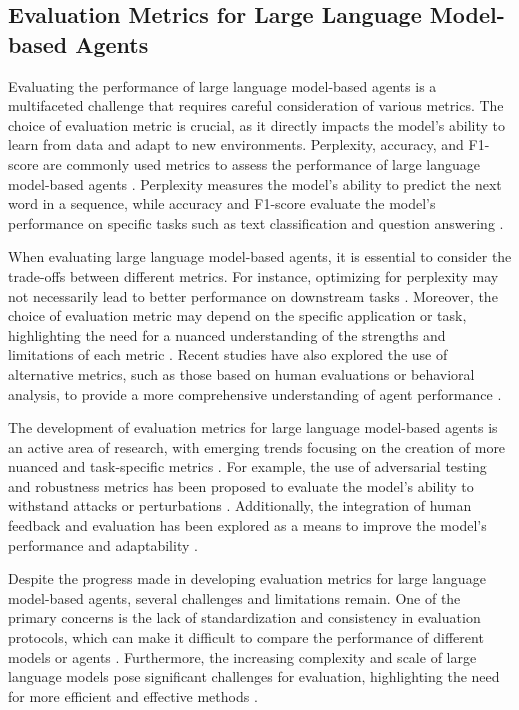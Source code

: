 \documentclass[11pt,a4paper]{article}
\begin{document}
\subsection{Evaluation Metrics for Large Language Model-based Agents}


Evaluating the performance of large language model-based agents is a multifaceted challenge that requires careful consideration of various metrics. The choice of evaluation metric is crucial, as it directly impacts the model's ability to learn from data and adapt to new environments. Perplexity, accuracy, and F1-score are commonly used metrics to assess the performance of large language model-based agents \cite{doi:10.1145/3641289}. Perplexity measures the model's ability to predict the next word in a sequence, while accuracy and F1-score evaluate the model's performance on specific tasks such as text classification and question answering \cite{arxiv:2404.09135}.

When evaluating large language model-based agents, it is essential to consider the trade-offs between different metrics. For instance, optimizing for perplexity may not necessarily lead to better performance on downstream tasks \cite{doi:10.1145/3748302}. Moreover, the choice of evaluation metric may depend on the specific application or task, highlighting the need for a nuanced understanding of the strengths and limitations of each metric \cite{arxiv:2402.12914}. Recent studies have also explored the use of alternative metrics, such as those based on human evaluations or behavioral analysis, to provide a more comprehensive understanding of agent performance \cite{arxiv:2308.03688}.

The development of evaluation metrics for large language model-based agents is an active area of research, with emerging trends focusing on the creation of more nuanced and task-specific metrics \cite{arxiv:2404.09022}. For example, the use of adversarial testing and robustness metrics has been proposed to evaluate the model's ability to withstand attacks or perturbations \cite{arxiv:2402.11208}. Additionally, the integration of human feedback and evaluation has been explored as a means to improve the model's performance and adaptability \cite{arxiv:2402.12914}.

Despite the progress made in developing evaluation metrics for large language model-based agents, several challenges and limitations remain. One of the primary concerns is the lack of standardization and consistency in evaluation protocols, which can make it difficult to compare the performance of different models or agents \cite{doi:10.1145/3641289}. Furthermore, the increasing complexity and scale of large language models pose significant challenges for evaluation, highlighting the need for more efficient and effective methods \cite{arxiv:2312.00678}.
\end{document}
